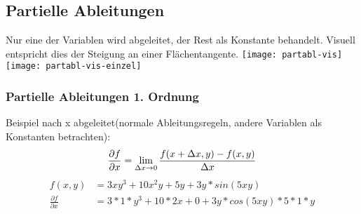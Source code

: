 \subsection{Partielle Ableitungen}

Nur eine der Variablen wird abgeleitet, der Rest als Konstante behandelt.
Visuell entspricht dies der Steigung an einer Flächentangente. \vfill
\texttt{[image: partabl-vis]}
\texttt{[image: partabl-vis-einzel]}


\subsubsection{Partielle Ableitungen 1. Ordnung}
Beispiel nach x abgeleitet(normale Ableitungsregeln, andere Variablen als Konstanten
betrachten):
$$
	\frac{\partial f}{\partial x} =
	\lim \limits_{\Delta x \to 0} \frac{f(x + \Delta x, y) - f(x,y)}{\Delta x} \\
$$
\begin{align*}
	f(x, y)                       & = 3xy^3 + 10x^2y + 5y + 3y * sin(5xy) \\
	\frac{\partial f}{\partial x} & =
	3 * 1 * y^3 + 10 * 2x + 0 + 3y * cos(5xy) * 5 * 1 * y
\end{align*}




